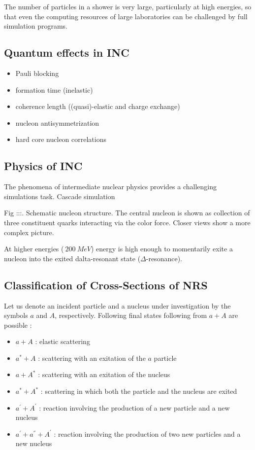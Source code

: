 The number of particles in a shower
    is very large, particularly at high energies, so that even the computing
    resources of large laboratories can be challenged by full simulation programs.

\subsection{Quantum effects in INC}

\begin{itemize}
\item Pauli blocking
\item formation time (inelastic)
\item coherence length ((quasi)-elastic and charge exchange)
\item nucleon antisymmetrization
\item hard core nucleon correlations
\end{itemize}

\subsection{Physics of INC}

The phenomena of intermediate nuclear physics provides a challenging simulations task.
Cascade simulation



Fig :::. Schematic nucleon structure. 
The central nucleon is shown as collection of three constituent quarks interacting via the color force. 
Closer views show a more complex picture.

At higher energies ($~200~MeV$) energy is high enough to momentarily exite a nucleon into the exited dalta-resonant state ($\Delta$-resonance).

\subsection{Classification of Cross-Sections of NRS}

Let us denote an incident particle and a nucleus under investigation by the symbols $a$ and $A$, respectively.
Following final states following from $a + A$ are possible \cite{iljinov94}:

\begin{itemize}
\item $a + A$ :  elastic scattering
\item $a^{*} + A$ :  scattering with an exitation of the $a$ particle
\item $a + A^{*}$ : scattering with an exitation of the nucleus
\item $a^{*} + A^{*}$ : scattering in which both the particle and the nucleus are exited
\item $a^{'} + A^{'}$ : reaction involving the production of a new particle and a new nucleus
\item $a^{'} + a^{''} + A^{'}$ : reaction involving the production of two new particles and a new nucleus
\end{itemize}

